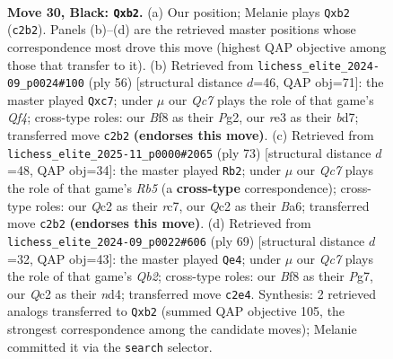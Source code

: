 \documentclass[11pt]{article}
\begin{document}
\clearpage

\begin{figure}[p]\centering
\begin{subfigure}{0.46\textwidth}\centering
\resizebox{\linewidth}{!}{%
\newchessgame
\chessboard[
  setfen={5b2/pp5p/6pk/8/8/P3R1P1/BPq2P1P/6K1 b - - 6 30},
  showmover=false,
  pgfstyle=straightmove, color=movearrow, markmove={c2-b2}
]}
\caption{}
\end{subfigure}\hfill
\begin{subfigure}{0.46\textwidth}\centering
\resizebox{\linewidth}{!}{%
\newchessgame
\chessboard[
  setfen={5r2/2pbk3/p7/1p3p2/4pQ2/2P5/P1P3P1/2K5 w - - 1 29},
  showmover=false,
  pgfstyle=straightmove, color=movearrow, markmove={f4-c7}
]}
\caption{}
\end{subfigure}
\\[4pt]
\begin{subfigure}{0.46\textwidth}\centering
\resizebox{\linewidth}{!}{%
\newchessgame
\chessboard[
  setfen={8/1PR2pkp/b3pp2/8/1r3P2/6P1/5PBP/4K3 b - - 2 37},
  showmover=false,
  pgfstyle=straightmove, color=movearrow, markmove={b4-b2}
]}
\caption{}
\end{subfigure}\hfill
\begin{subfigure}{0.46\textwidth}\centering
\resizebox{\linewidth}{!}{%
\newchessgame
\chessboard[
  setfen={6k1/1q3pp1/1P2p3/7p/3N4/4P2P/5PP1/1R4K1 b - - 1 35},
  showmover=false,
  pgfstyle=straightmove, color=movearrow, markmove={b7-e4}
]}
\caption{}
\end{subfigure}
\caption{\textbf{Move 30, Black: \texttt{Qxb2}.} (a) Our position; Melanie plays \texttt{Qxb2} (\texttt{c2b2}). Panels (b)--(d) are the retrieved master positions whose correspondence most drove this move (highest QAP objective among those that transfer to it). (b) Retrieved from \texttt{lichess\_elite\_2024-09\_p0024\#100} (ply 56) [structural distance $d$=46, QAP obj=71]: the master played \texttt{Qxc7}; under $\mu$ our \emph{Qc7} plays the role of that game's \emph{Qf4}; cross-type roles: our \emph{B}f8 as their \emph{P}g2, our \emph{r}e3 as their \emph{b}d7; transferred move \texttt{c2b2} \textbf{(endorses this move)}. (c) Retrieved from \texttt{lichess\_elite\_2025-11\_p0000\#2065} (ply 73) [structural distance $d$=48, QAP obj=34]: the master played \texttt{Rb2}; under $\mu$ our \emph{Qc7} plays the role of that game's \emph{Rb5} (a \textbf{cross-type} correspondence); cross-type roles: our \emph{Q}c2 as their \emph{r}c7, our \emph{Q}c2 as their \emph{B}a6; transferred move \texttt{c2b2} \textbf{(endorses this move)}. (d) Retrieved from \texttt{lichess\_elite\_2024-09\_p0022\#606} (ply 69) [structural distance $d$=32, QAP obj=43]: the master played \texttt{Qe4}; under $\mu$ our \emph{Qc7} plays the role of that game's \emph{Qb2}; cross-type roles: our \emph{B}f8 as their \emph{P}g7, our \emph{Q}c2 as their \emph{n}d4; transferred move \texttt{c2e4}. Synthesis: 2 retrieved analogs transferred to \texttt{Qxb2} (summed QAP objective 105, the strongest correspondence among the candidate moves); Melanie committed it via the \texttt{search} selector.}
\label{fig:thought-m59}
\end{figure}
\end{document}
